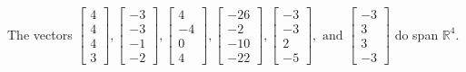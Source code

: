 \begin{exercise}
\begin{exerciseStatement}
  \end{exerciseStatement}
  \begin{exerciseAnswer}
   The vectors \(\left[\begin{array}{r}
4 \\
4 \\
4 \\
3
\end{array}\right] , \left[\begin{array}{r}
-3 \\
-3 \\
-1 \\
-2
\end{array}\right] , \left[\begin{array}{r}
4 \\
-4 \\
0 \\
4
\end{array}\right] , \left[\begin{array}{r}
-26 \\
-2 \\
-10 \\
-22
\end{array}\right] , \left[\begin{array}{r}
-3 \\
-3 \\
2 \\
-5
\end{array}\right] , \text{ and } \left[\begin{array}{r}
-3 \\
3 \\
3 \\
-3
\end{array}\right]\) 
  	 do  
	span \(\mathbb{R}^4\).
  


  \end{exerciseAnswer}
\end{exercise}